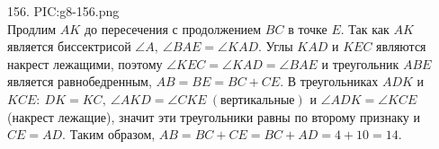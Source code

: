 156. {{PIC:g8-156.png}}\\
Продлим $AK$ до пересечения с продолжением $BC$ в точке $E.$ Так как $AK$ является биссектрисой $\angle A,\ \angle BAE=\angle KAD.$ Углы $KAD$ и $KEC$ являются накрест лежащими, поэтому $\angle KEC=\angle KAD=\angle BAE$ и треугольник $ABE$ является равнобедренным, $AB=BE=BC+CE.$ В треугольниках $ADK$ и $KCE:\ DK=KC,\ \angle AKD=\angle CKE\ (\text{вертикальные})$ и $\angle ADK=\angle KCE$ (накрест лежащие), значит эти треугольники равны по второму признаку и $CE=AD.$ Таким образом, $AB=BC+CE=BC+AD=4+10=14.$\\
